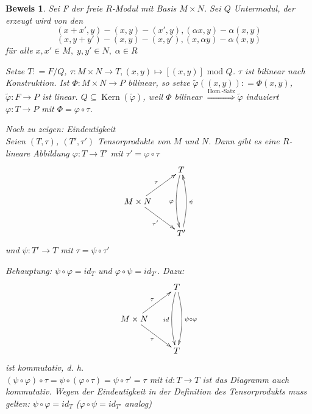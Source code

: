 \documentclass[a4paper,12pt]{scrbook}
\theoremstyle{break}
\newtheorem{anBew}[Def]{Beweis}
\theoremstyle{nonumberbreak}
\theoremstyle{nonumberplain}
\newcommand{\defeqr}[0]{\mathrel{\mathop:}=}
\DeclareMathOperator{\Kern}{Kern}
\begin{document}
\begin{anBew}
  Sei F der freie $R$-Modul mit Basis $M \times N$.
  Sei $Q$ Untermodul, der erzeugt wird von den \[(x + x',y) - (x,y) - (x',y),
  (\alpha x,y) - \alpha (x,y)\] \[(x,y + y') - (x,y) - (x,y'),
  (x,\alpha y) - \alpha (x,y)\] für alle $x,x' \in M,\; y,y' \in N,\;\alpha \in
  R$

  Setze $T \defeqr F/Q$, $\tau: M \times N \to T, (x,y) \mapsto [(x,y)]
  \mbox{ mod } Q$. $\tau$ ist bilinear nach Konstruktion.
  Ist $\Phi: M \times N \to P$ bilinear, so setze $\tilde{\varphi}((x,y))
  \defeqr \Phi(x,y)$, $\tilde{\varphi}: F \to P$ ist linear. $Q \subseteq
  \Kern(\tilde{\varphi})$, weil $\Phi$ bilinear $\overset{\text{Hom.-Satz}}{\Rightarrow}
  \tilde{\varphi}$ induziert $\varphi: T \to P$ mit $\Phi = \varphi \circ \tau$.

  Noch zu zeigen: Eindeutigkeit\\
  Seien $(T, \tau)$, $(T', \tau')$ Tensorprodukte von $M$ und $N$. Dann gibt es eine $R$-lineare 
  Abbildung $\varphi: T \rightarrow T'$ mit $\tau'= \varphi \circ \tau$
  \[\begin{xy}
      \xymatrix{
                                                  & T \ar@/_/[dd]_{\varphi} \\
        M \times N \ar[ur]^{\tau} \ar[dr]_{\tau'} &                     \\
                                                  & T' \ar@/_/[uu]_{\psi}
      }
    \end{xy}\]
  und $\psi: T' \rightarrow T$ mit $\tau = \psi \circ\tau'$

  Behauptung: $\psi \circ \varphi = id_T$ und $\varphi \circ \psi = id_{T'}$. Dazu:
  \[\begin{xy}
      \xymatrix{
                                                 & T \ar@/_/[dd]_{id}
                                                 \ar@/^/[dd]^{\psi \circ \varphi} \\
        M \times N \ar[ur]^{\tau} \ar[dr]_{\tau} &                     \\
                                                 & T
      }
    \end{xy}\]
  ist kommutativ, d. h.\\
  $(\psi \circ \varphi ) \circ \tau = \psi \circ ( \varphi \circ \tau) = \psi \circ \tau' = \tau$
  mit $id: T \rightarrow T$ ist das Diagramm auch kommutativ. Wegen der Eindeutigkeit in der 
  Definition des Tensorprodukts muss gelten: $\psi \circ \varphi = id_T$
  ($\varphi \circ \psi = id_{T'}$ analog)
\end{anBew}
\end{document}
